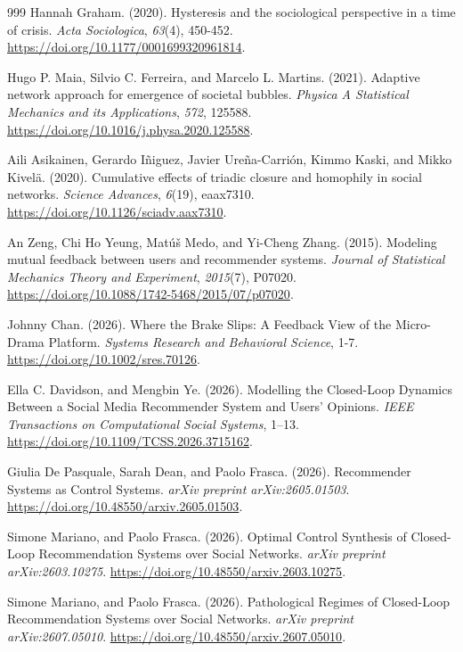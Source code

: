 \begin{thebibliography}{999}
Hannah Graham. (2020). Hysteresis and the sociological perspective in a time of crisis. \textit{Acta Sociologica}, \textit{63}(4), 450-452. \url{https://doi.org/10.1177/0001699320961814}.

Hugo P. Maia, Silvio C. Ferreira, and Marcelo L. Martins. (2021). Adaptive network approach for emergence of societal bubbles. \textit{Physica A Statistical Mechanics and its Applications}, \textit{572}, 125588. \url{https://doi.org/10.1016/j.physa.2020.125588}.

Aili Asikainen, Gerardo I\~{n}iguez, Javier Ure\~{n}a-Carri\'{o}n, Kimmo Kaski, and Mikko Kivel\"{a}. (2020). Cumulative effects of triadic closure and homophily in social networks. \textit{Science Advances}, \textit{6}(19), eaax7310. \url{https://doi.org/10.1126/sciadv.aax7310}.

An Zeng, Chi Ho Yeung, Mat\'{u}\v{s} Medo, and Yi-Cheng Zhang. (2015). Modeling mutual feedback between users and recommender systems. \textit{Journal of Statistical Mechanics Theory and Experiment}, \textit{2015}(7), P07020. \url{https://doi.org/10.1088/1742-5468/2015/07/p07020}.

Johnny Chan. (2026). Where the Brake Slips: A Feedback View of the Micro-Drama Platform. \textit{Systems Research and Behavioral Science}, 1-7. \url{https://doi.org/10.1002/sres.70126}.

Ella C. Davidson, and Mengbin Ye. (2026). Modelling the Closed-Loop Dynamics Between a Social Media Recommender System and Users' Opinions. \textit{IEEE Transactions on Computational Social Systems}, 1--13. \url{https://doi.org/10.1109/TCSS.2026.3715162}.

Giulia De Pasquale, Sarah Dean, and Paolo Frasca. (2026). Recommender Systems as Control Systems. \textit{arXiv preprint arXiv:2605.01503}. \url{https://doi.org/10.48550/arxiv.2605.01503}.

Simone Mariano, and Paolo Frasca. (2026). Optimal Control Synthesis of Closed-Loop Recommendation Systems over Social Networks. \textit{arXiv preprint arXiv:2603.10275}. \url{https://doi.org/10.48550/arxiv.2603.10275}.

Simone Mariano, and Paolo Frasca. (2026). Pathological Regimes of Closed-Loop Recommendation Systems over Social Networks. \textit{arXiv preprint arXiv:2607.05010}. \url{https://doi.org/10.48550/arxiv.2607.05010}.


\end{thebibliography}
